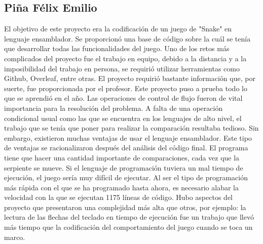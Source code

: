 \documentclass[12pt]{article}
\begin{document}
\subsection*{Piña Félix Emilio}
El objetivo de este proyecto era la codificación de un juego de "Snake" en lenguaje ensamblador. Se proporcionó una base de código sobre la cuál se tenía que desarrollar todas las funcionalidades del juego. Uno de los retos más complicados del proyecto fue el trabajo en equipo, debido a la distancia y a la imposibilidad del trabajo en persona, se requirió utilizar herramientas como Github, Overleaf, entre otras. El proyecto requirió bastante información que, por suerte, fue proporcionada por el profesor. Este proyecto puso a prueba todo lo que se aprendió en el año. Las operaciones de control de flujo fueron de vital importancia para la resolución del problema. A falta de una operación condicional usual como las que se encuentra en los lenguajes de alto nivel, el trabajo que se tenía que poner para realizar la comparación resultaba tedioso. Sin embargo, existieron muchas ventajas de usar el lenguaje ensamblador. Este tipo de ventajas se racionalizaron después del análisis del código final. El programa tiene que hacer una cantidad importante de comparaciones, cada vez que la serpiente se mueve. Si el lenguaje de programación tuviera un mal tiempo de ejecución, el juego sería muy difícil de ejecutar. Al ser el tipo de programación más rápida con el que se ha programado hasta ahora, es necesario alabar la velocidad con la que se ejecutan 1175 líneas de código. Hubo aspectos del proyecto que presentaron una complejidad más alta que otros, por ejemplo: la lectura de las flechas del teclado en tiempo de ejecución fue un trabajo que llevó más tiempo que la codificación del comportamiento del juego cuando se toca un marco. 
\end{document}
